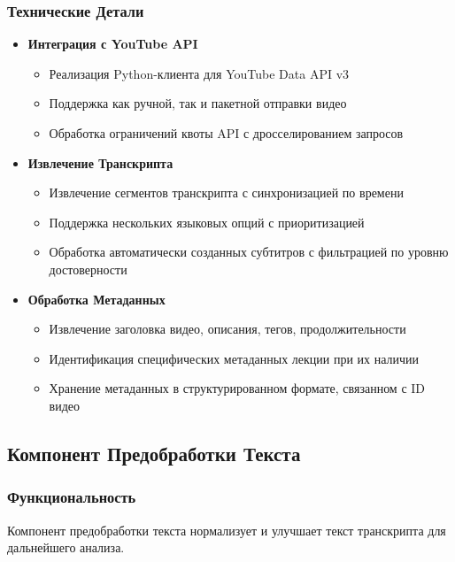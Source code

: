 \documentclass[12pt,a4paper]{article}
\begin{document}
\subsubsection{Технические Детали}
\begin{itemize}
    \item \textbf{Интеграция с YouTube API}
    \begin{itemize}
        \item Реализация Python-клиента для YouTube Data API v3
        \item Поддержка как ручной, так и пакетной отправки видео
        \item Обработка ограничений квоты API с дросселированием запросов
    \end{itemize}

    \item \textbf{Извлечение Транскрипта}
    \begin{itemize}
        \item Извлечение сегментов транскрипта с синхронизацией по времени
        \item Поддержка нескольких языковых опций с приоритизацией
        \item Обработка автоматически созданных субтитров с фильтрацией по уровню достоверности
    \end{itemize}

    \item \textbf{Обработка Метаданных}
    \begin{itemize}
        \item Извлечение заголовка видео, описания, тегов, продолжительности
        \item Идентификация специфических метаданных лекции при их наличии
        \item Хранение метаданных в структурированном формате, связанном с ID видео
    \end{itemize}
\end{itemize}

\subsection{Компонент Предобработки Текста}

\subsubsection{Функциональность}
Компонент предобработки текста нормализует и улучшает текст транскрипта для дальнейшего анализа.
\end{document}

